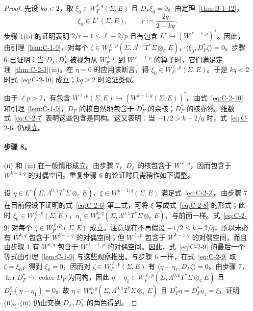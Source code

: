 \begin{proof}
先设 $kq<2$，取 $\xi_0\in W_F^{k,q}(\Sigma,E)$ 且 $D_F\xi_0=0$。由定理~\ref{thm:B-1-12}，
\[
  \xi_0\in L^r(\Sigma,E),\qquad r:=\frac{2q}{2-kq}.
\]
步骤 1(b) 的证明表明 $2/r-1\le\ell-2/p$ 且有包含 $L^r\hookrightarrow(W^{\ell-1,p})^*$。因此，由引理~\ref{lem:C-1-9}，对每个 $\zeta\in W_F^{\ell,p}(\Sigma,\Lambda^{0,1}T^*\Sigma\otimes_{\mathbb C}E)$，$\langle\xi_0,D_F^*\zeta\rangle=0$。步骤 6 已证明：当 $D_F,D_F^*$ 被视为从 $W_F^{\ell,p}$ 到 $W^{\ell-1,p}$ 的算子时，它们满足定理~\ref{thm:C-2-3}(iii)。在 $\eta=0$ 时应用该断言，得 $\xi_0\in W_F^{\ell,p}(\Sigma,E)$。于是 $kq<2$ 时式~\eqref{eq:C-2-10} 成立；$kq\ge2$ 时论证类似。

由于 $\ell p>2$，有包含 $W^{\ell,p}(\Sigma,E)\hookrightarrow(W^{k-1,q}(\Sigma,E))^*$。由式~\eqref{eq:C-2-10} 和引理~\ref{lem:C-1-9}，$D_F$ 的核自然地包含于 $D_F^*$ 的余核；$D_F^*$ 的核亦然。维数式~\eqref{eq:C-2-7} 表明这些包含是同构。这又表明：当 $-1/2>k-2/q$ 时，式~\eqref{eq:C-2-6} 仍成立。

\paragraph{步骤 8。} (ii) 和 (iii) 在一般情形成立。由步骤 7，$D_F$ 的核包含于 $W^{\ell,p}$，因而包含于 $W^{k-1,q}$ 的对偶空间。重复步骤 6 的论证时只需稍作如下调整。

设 $\eta\in L^r(\Sigma,\Lambda^{0,1}T^*\Sigma\otimes_{\mathbb C}E)$、$\xi\in W^{k-1,q}(\Sigma,E)$ 满足式~\eqref{eq:C-2-2}。由步骤 7 在目前假设下证明的式~\eqref{eq:C-2-6} 第二式，可将 $\xi$ 写成式~\eqref{eq:C-2-8} 的形式；此时 $\xi_0\in W_F^{\ell,p}(\Sigma,E)$，$\eta_1\in W_F^{k,q}(\Sigma,\Lambda^{0,1}T^*\Sigma\otimes_{\mathbb C}E)$，与前面一样。式~\eqref{eq:C-2-9} 对每个 $\zeta\in W_F^{\ell,p}(\Sigma,E)$ 成立。注意现在不再假设 $-1/2\le k-2/q$，所以未必有 $W^{k,q}$ 包含于 $W^{k-1,q}$ 的对偶空间；但 $W^{\ell,p}$ 包含于 $W^{k-1,q}$ 的对偶空间，而且由步骤 1 有 $W^{k,q}$ 包含于 $W^{\ell-1,p}$ 的对偶空间。因此，式~\eqref{eq:C-2-9} 的最后一个等式由引理~\ref{lem:C-1-9} 与这些观察推出。与步骤 6 一样，在式~\eqref{eq:C-2-9} 取 $\zeta=\xi_0$，得到 $\xi_0=0$，因而对 $\zeta\in W_F^{\ell,p}(\Sigma,E)$ 有 $\langle\eta-\eta_1,D_F\zeta\rangle=0$。由步骤 7，$\ker D_F^*\hookrightarrow\operatorname{coker}D_F$ 为同构，因此 $\eta-\eta_1\in W_F^{\ell,p}(\Sigma,\Lambda^{0,1}T^*\Sigma\otimes_{\mathbb C}E)$ 且 $D_F^*(\eta-\eta_1)=0$。故 $\eta\in W_F^{k,q}(\Sigma,\Lambda^{0,1}T^*\Sigma\otimes_{\mathbb C}E)$ 且 $D_F^*\eta=D_F^*\eta_1=\xi$，证明 (ii)。(iii) 仍由交换 $D_F,D_F^*$ 的角色得到。
\end{proof}

